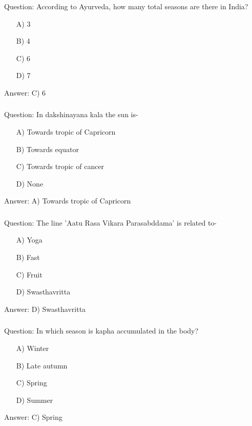 \begin{frame}[fragile]\frametitle{}

Question: According to Ayurveda, how many total seasons are there in India?

\begin{itemize}
\item[A)] 3
\item[B)] 4
\item[C)] 6
\item[D)] 7
\end{itemize}

Answer: C) 6
\end{frame}

\begin{frame}[fragile]\frametitle{}

Question: In dakshinayana kala the sun is-

\begin{itemize}
\item[A)] Towards tropic of Capricorn
\item[B)] Towards equator
\item[C)] Towards tropic of cancer
\item[D)] None
\end{itemize}

Answer: A) Towards tropic of Capricorn
\end{frame}

\begin{frame}[fragile]\frametitle{}

Question: The line 'Aatu Rasa Vikara Parasabddama' is related to-

\begin{itemize}
\item[A)] Yoga
\item[B)] Fast
\item[C)] Fruit
\item[D)] Swasthavritta
\end{itemize}

Answer: D) Swasthavritta
\end{frame}

\begin{frame}[fragile]\frametitle{}

Question: In which season is kapha accumulated in the body?

\begin{itemize}
\item[A)] Winter
\item[B)] Late autumn
\item[C)] Spring
\item[D)] Summer
\end{itemize}

Answer: C) Spring
\end{frame}


